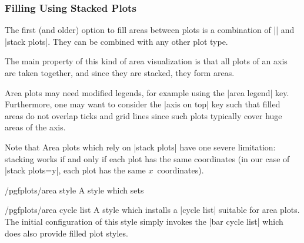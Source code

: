{\subsubsection{Filling Using Stacked Plots}

The first (and older) option to fill areas between plots is a combination of
|\closedcycle| and |stack plots|. They can be combined with any other plot
type.

\begin{codeexample}[]
\end{codeexample}
%
\noindent The main property of this kind of area visualization is that all
plots of an axis are taken together, and since they are stacked, they form
areas.

\noindent Area plots may need modified legends, for example using the
|area legend| key. Furthermore, one may want to consider the |axis on top| key
such that filled areas do not overlap ticks and grid lines since such plots
typically cover huge areas of the axis.

Note that Area plots which rely on |stack plots| have one severe limitation:
stacking works if and only if each plot has the same coordinates (in our case
of |stack plots=y|, each plot has the same $x$~coordinates).

\begin{stylekey}{/pgfplots/area style}
    A style which sets
\begin{codeexample}
\end{codeexample}
\end{stylekey}

\begin{stylekey}{/pgfplots/area cycle list}
    A style which installs a |cycle list| suitable for area plots. The initial
    configuration of this style simply invokes the |bar cycle list| which does
    also provide filled plot styles.
\end{stylekey}

}
